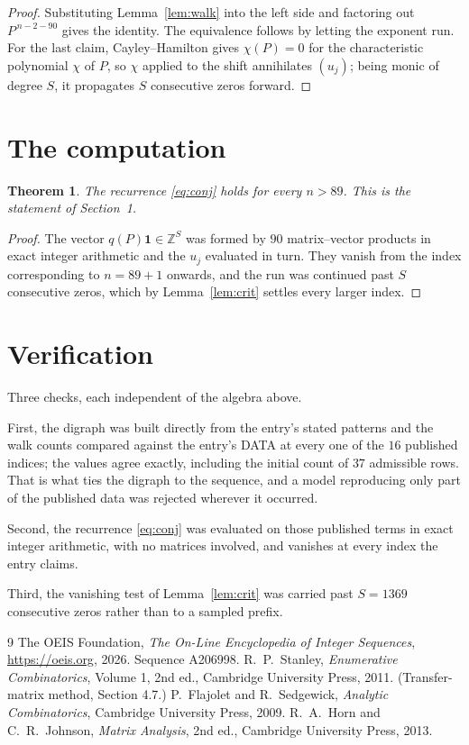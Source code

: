 \documentclass[11pt,a4paper]{article}
\theoremstyle{plain}
\newtheorem{theorem}{Theorem}
\theoremstyle{definition}
\begin{document}
\begin{proof}
Substituting Lemma~\ref{lem:walk} into the left side and factoring out
$P^{\,n-2-90}$ gives the identity. The equivalence follows by letting the exponent
run. For the last claim, Cayley--Hamilton gives $\chi(P)=0$ for the characteristic
polynomial $\chi$ of $P$, so $\chi$ applied to the shift annihilates $(u_j)$; being monic of
degree $S$, it propagates $S$ consecutive zeros forward.
\end{proof}

\section{The computation}

\begin{theorem}
The recurrence \eqref{eq:conj} holds for every $n>89$. This is the statement of
Section~1.
\end{theorem}

\begin{proof}
The vector $q(P)\mathbf{1}\in\mathbb{Z}^{S}$ was formed by $90$ matrix--vector
products in exact integer arithmetic and the $u_j$ evaluated in turn. They vanish from the
index corresponding to $n=89+1$ onwards, and the run was continued past $S$ consecutive
zeros, which by Lemma~\ref{lem:crit} settles every larger index.
\end{proof}

\section{Verification}

Three checks, each independent of the algebra above.

First, the digraph was built directly from the entry's stated patterns and the walk counts
compared against the entry's DATA at every one of the $16$ published indices; the
values agree exactly, including the initial count of $37$ admissible rows. That is
what ties the digraph to the sequence, and a model reproducing only part of the published
data was rejected wherever it occurred.

Second, the recurrence \eqref{eq:conj} was evaluated on those published terms in exact
integer arithmetic, with no matrices involved, and vanishes at every index the entry claims.

Third, the vanishing test of Lemma~\ref{lem:crit} was carried past $S=1369$ consecutive
zeros rather than to a sampled prefix.

\begin{thebibliography}{9}
 The OEIS Foundation, \emph{The On-Line Encyclopedia of Integer
Sequences}, \url{https://oeis.org}, 2026. Sequence A206998.
 R.~P.~Stanley, \emph{Enumerative Combinatorics}, Volume 1, 2nd ed.,
Cambridge University Press, 2011. (Transfer-matrix method, Section 4.7.)
 P.~Flajolet and R.~Sedgewick, \emph{Analytic Combinatorics}, Cambridge
University Press, 2009.
 R.~A.~Horn and C.~R.~Johnson, \emph{Matrix Analysis}, 2nd ed., Cambridge
University Press, 2013.
\end{thebibliography}
\end{document}
